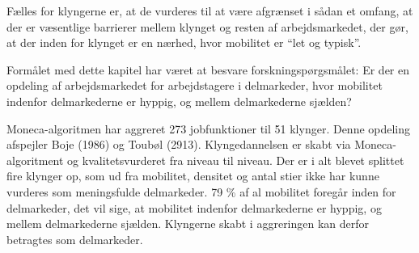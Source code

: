 Fælles for klyngerne er, at de vurderes til at være afgrænset i sådan et omfang, at der er væsentlige barrierer mellem klynget og resten af arbejdsmarkedet, der gør, at der inden for klynget er en nærhed, hvor mobilitet er “let og typisk”.

Formålet med dette kapitel har været at besvare forskningspørgsmålet: Er der en opdeling af arbejdsmarkedet for arbejdstagere i delmarkeder, hvor mobilitet indenfor delmarkederne er hyppig, og mellem delmarkederne sjælden?

Moneca-algoritmen har aggreret 273 jobfunktioner til 51 klynger. Denne opdeling afspejler Boje (1986) og Toubøl (2913). Klyngedannelsen er skabt via Moneca-algoritment og kvalitetsvurderet fra niveau til niveau. Der er i alt blevet splittet fire klynger op, som ud fra mobilitet, densitet og antal stier ikke har kunne vurderes som meningsfulde delmarkeder. 79 \% af al mobilitet foregår inden for delmarkeder, det vil sige, at mobilitet indenfor delmarkederne er hyppig, og mellem delmarkederne sjælden. Klyngerne skabt i aggreringen kan derfor betragtes som delmarkeder.



% 
% 
%
%
%
%
%
%
%
%
%
%
%
%
%
%
%
%
